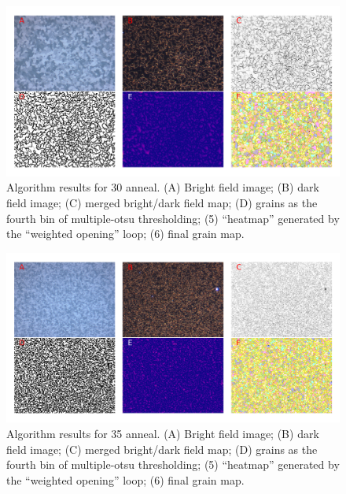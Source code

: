 \documentclass[12pt, titlepage]{article}
\begin{document}
	\begin{figure}[h]
		\centering
		\includegraphics[width=1.0\linewidth]{microstructure_30C.png}
		\caption{Algorithm results for 30  anneal. (A) Bright field image; (B) dark field image; (C) merged bright/dark field map; (D) grains as the fourth bin of multiple-otsu thresholding; (5) ``heatmap'' generated by the ``weighted opening'' loop; (6) final grain map.}
		\label{fig:micro_30C}
	\end{figure}

	\begin{figure}[h]
		\centering
		\includegraphics[width=1.0\linewidth]{microstructure_35C.png}
		\caption{Algorithm results for 35  anneal. (A) Bright field image; (B) dark field image; (C) merged bright/dark field map; (D) grains as the fourth bin of multiple-otsu thresholding; (5) ``heatmap'' generated by the ``weighted opening'' loop; (6) final grain map.}
		\label{fig:micro_25C}
	\end{figure}
\end{document}
